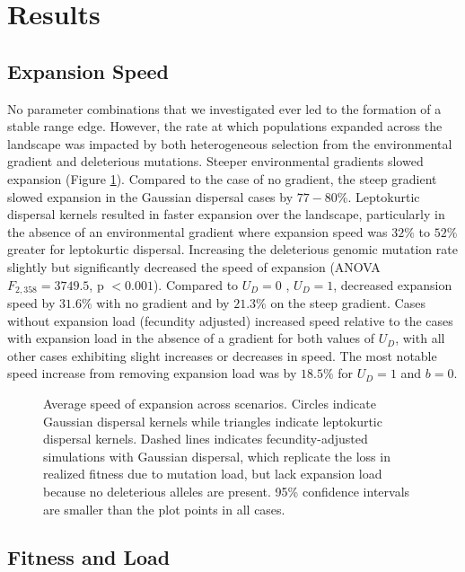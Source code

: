 \section{Results}

\subsection*{Expansion Speed}
No parameter combinations that we investigated ever led to the formation of a stable range edge. However, the rate at which populations expanded across the landscape was impacted by both heterogeneous selection from the environmental gradient and deleterious mutations. Steeper environmental gradients slowed expansion (Figure \ref{fig:speed}). Compared to the case of no gradient, the steep gradient slowed expansion in the Gaussian dispersal cases by $77-80\%$. Leptokurtic dispersal kernels resulted in faster expansion over the landscape, particularly in the absence of an environmental gradient where expansion speed was $32\%$ to $52\%$ greater for leptokurtic dispersal. Increasing the deleterious genomic mutation rate slightly but significantly decreased the speed of expansion (ANOVA $F_{2,358} = 3749.5$,  p $< 0.001$). Compared to $U_D = 0$ , $U_D = 1$, decreased expansion speed by $31.6\%$ with no gradient and by $21.3\%$ on the steep gradient. Cases without expansion load (fecundity adjusted) increased speed relative to the cases with expansion load in the absence of a gradient for both values of $U_D$, with all other cases exhibiting slight increases or decreases in speed. The most notable speed increase from removing expansion load was by $18.5\%$ for $U_D = 1$ and $b = 0$.  

\begin{figure}[h]
\centering
{}
\caption[~- Average speed of expansion.]{Average speed of expansion across scenarios. Circles indicate Gaussian dispersal kernels while triangles indicate leptokurtic dispersal kernels. Dashed lines indicates fecundity-adjusted simulations with Gaussian dispersal, which replicate the loss in realized fitness due to mutation load, but lack expansion load because no deleterious alleles are present. 95\% confidence intervals are smaller than the plot points in all cases.}
\label{fig:speed}
\end{figure}




\subsection*{Fitness and Load}

